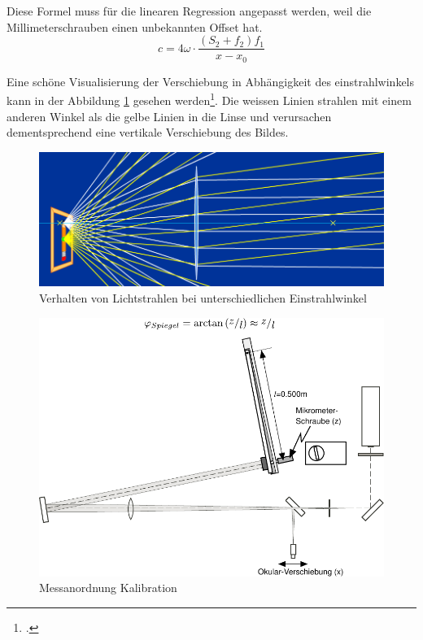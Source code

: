 Diese Formel muss f\"ur die linearen Regression angepasst werden, weil die Millimeterschrauben einen unbekannten Offset hat.
\begin{equation}
    c = 4\omega \cdot \frac{(S_2 + f_2)f_1}{x - x_0}
    \label{eq:lichtgeschwindigkeit}
\end{equation}

Eine   sch\"one   Visualisierung   der   Verschiebung   in   Abh\"angigkeit  des
einstrahlwinkels  kann  in  der   Abbildung  \ref{fig:lense-simulation}  gesehen
werden\footcite{ref:linsen-simulation}. Die  weissen  Linien  strahlen mit einem
anderen Winkel als die gelbe Linien in die Linse und verursachen dementsprechend
eine vertikale Verschiebung des Bildes.

\begin{figure}[H]
    \center
    \includegraphics[width=.8\textwidth]{images/lense-simulation.png}
    \caption{Verhalten von Lichtstrahlen bei unterschiedlichen Einstrahlwinkel}
    \label{fig:lense-simulation}
\end{figure}

\begin{figure}[H]
    \center
    \includegraphics[width=.8\textwidth]{images/kalibration.pdf}
    \caption{Messanordnung Kalibration}
    \label{fig:kalibration}
\end{figure}

